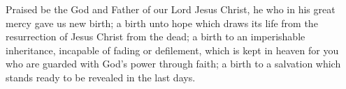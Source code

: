 \lettrine[lines=3]{P}{}raised be the God and Father of our Lord Jesus Christ, he who in his great mercy gave us new birth; a birth unto hope which draws its life from the resurrection of Jesus Christ from the dead; a birth to an imperishable inheritance, incapable of fading or defilement, which is kept in heaven for you who are guarded with God’s power through faith; a birth to a salvation which stands ready to be revealed in the last days.
